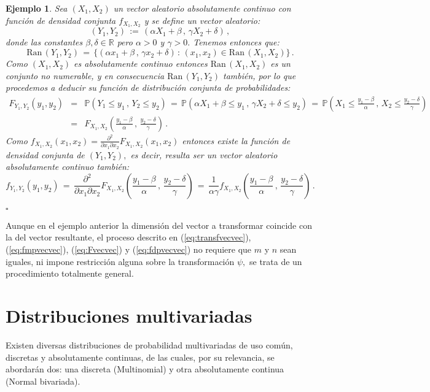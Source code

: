 \documentclass[spanish,10pt,letterpaper]{article}
\newtheorem{ejem}{Ejemplo}
\newcommand{\prob}{\mathbb{P}}
\newcommand{\Runo}{\mathbb{R}}
\newcommand{\qed}{\begin{flushright}$\square$\end{flushright}}
\begin{document}
\bigskip 

\begin{ejem}\label{ej:transfvecvec}
    Sea $(X_1,X_2)$ un vector aleatorio absolutamente continuo con función de densidad conjunta $f_{X_1,X_2}$ y se define un vector aleatorio:
    $$(Y_1,Y_2) \,:=\, (\alpha X_1+\beta\,,\,\gamma X_2+\delta)\,,$$
    donde las constantes $\beta,\delta\in\Runo$ pero $\alpha>0$ y $\gamma>0.$ Tenemos entonces que:
    $$\text{Ran}\,(Y_1,Y_2) \,=\,\{(\alpha x_1+\beta\,,\,\gamma x_2+\delta)\,:\,(x_1,x_2)\in\text{Ran}\,(X_1,X_2)\}\,.$$
    Como $(X_1,X_2)$ es absolutamente continuo entonces $\text{Ran}\,(X_1,X_2)$ es un conjunto no numerable, y en consecuencia $\text{Ran}\,(Y_1,Y_2)$ también, por lo que procedemos a deducir su función de distribución conjunta de probabilidades:
    \begin{eqnarray*}
        F_{Y_1,Y_2}(y_1,y_2) &=& \prob(Y_1\leq y_1\,,\,Y_2\leq y_2) \,=\, \prob(\alpha X_1+\beta\leq y_1\,,\,\gamma X_2+\delta\leq y_2) \,=\, \prob\left(X_1\leq\frac{y_1-\beta}{\alpha}\,,\,X_2\leq\frac{y_2-\delta}{\gamma}\right) \\ 
        &=& F_{X_1,X_2}\left(\frac{y_1-\beta}{\alpha}\,,\,\frac{y_2-\delta}{\gamma}\right)\,.
    \end{eqnarray*}
    Como $f_{X_1,X_2}(x_1,x_2)=\frac{\partial^2}{\partial x_1\partial x_2}F_{X_1,X_2}(x_1,x_2)$ entonces existe la función de densidad conjunta de $(Y_1,Y_2),$ es decir, resulta ser un vector aleatorio absolutamente continuo también:
    $$f_{Y_1,Y_2}(y_1,y_2) \,=\, \frac{\partial^2}{\partial x_1\partial x_2}F_{X_1,X_2}\left(\frac{y_1-\beta}{\alpha}\,,\,\frac{y_2-\delta}{\gamma}\right) \,=\, \frac{1}{\alpha\gamma}f_{X_1,X_2}\left(\frac{y_1-\beta}{\alpha}\,,\,\frac{y_2-\delta}{\gamma}\right)\,.$$ \qed
\end{ejem}
    
Aunque en el ejemplo anterior la dimensión del vector a transformar coincide con la del vector resultante, el proceso descrito en (\ref{eq:transfvecvec}), (\ref{eq:fmpvecvec}), (\ref{eq:Fvecvec}) y (\ref{eq:fdpvecvec}) no requiere que $m$ y $n$ sean iguales, ni impone restricción alguna sobre la transformación $\psi,$ se trata de un procedimiento totalmente general.



\newpage
\section{Distribuciones multivariadas}

Existen diversas distribuciones de probabilidad multivariadas de uso común, discretas y absolutamente continuas, de las cuales, por su relevancia, se abordarán dos: una discreta (Multinomial) y otra absolutamente continua (Normal bivariada).
\end{document}
